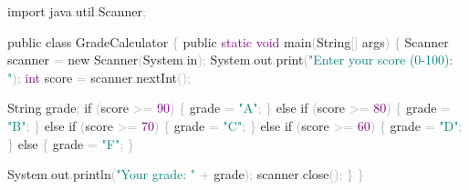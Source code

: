 \documentclass[
  justified,
  openright,
]{tufte-book}
\newcommand{\BuiltInTok}[1]{#1}
\newcommand{\ControlFlowTok}[1]{\textcolor{BrandBlue}{#1}}
\newcommand{\DataTypeTok}[1]{\textcolor{Purple}{#1}}
\newcommand{\DecValTok}[1]{\textcolor{Purple}{#1}}
\newcommand{\FunctionTok}[1]{\textcolor{BrandBlue}{#1}}
\newcommand{\ImportTok}[1]{\textcolor{BrandAccent}{#1}}
\newcommand{\KeywordTok}[1]{\textcolor{BrandBlue}{#1}}
\newcommand{\NormalTok}[1]{#1}
\newcommand{\OperatorTok}[1]{\textcolor{DarkGray}{#1}}
\newcommand{\StringTok}[1]{\textcolor{Teal}{#1}}
\newenvironment{Shaded}{%
  \begin{snugshade}
}{%
  \end{snugshade}
}
\begin{document}
\begin{Shaded}
\begin{Highlighting}[]
\KeywordTok{import} \ImportTok{java}\OperatorTok{.}\ImportTok{util}\OperatorTok{.}\ImportTok{Scanner}\OperatorTok{;}

\KeywordTok{public} \KeywordTok{class}\NormalTok{ GradeCalculator }\OperatorTok{\{}
    \KeywordTok{public} \DataTypeTok{static} \DataTypeTok{void} \FunctionTok{main}\OperatorTok{(}\BuiltInTok{String}\OperatorTok{[]}\NormalTok{ args}\OperatorTok{)} \OperatorTok{\{}
        \BuiltInTok{Scanner}\NormalTok{ scanner }\OperatorTok{=} \KeywordTok{new} \BuiltInTok{Scanner}\OperatorTok{(}\BuiltInTok{System}\OperatorTok{.}\FunctionTok{in}\OperatorTok{);}
        \BuiltInTok{System}\OperatorTok{.}\FunctionTok{out}\OperatorTok{.}\FunctionTok{print}\OperatorTok{(}\StringTok{"Enter your score (0{-}100): "}\OperatorTok{);}
        \DataTypeTok{int}\NormalTok{ score }\OperatorTok{=}\NormalTok{ scanner}\OperatorTok{.}\FunctionTok{nextInt}\OperatorTok{();}

        \BuiltInTok{String}\NormalTok{ grade}\OperatorTok{;}
        \ControlFlowTok{if} \OperatorTok{(}\NormalTok{score }\OperatorTok{\textgreater{}=} \DecValTok{90}\OperatorTok{)} \OperatorTok{\{}
\NormalTok{            grade }\OperatorTok{=} \StringTok{"A"}\OperatorTok{;}
        \OperatorTok{\}} \ControlFlowTok{else} \ControlFlowTok{if} \OperatorTok{(}\NormalTok{score }\OperatorTok{\textgreater{}=} \DecValTok{80}\OperatorTok{)} \OperatorTok{\{}
\NormalTok{            grade }\OperatorTok{=} \StringTok{"B"}\OperatorTok{;}
        \OperatorTok{\}} \ControlFlowTok{else} \ControlFlowTok{if} \OperatorTok{(}\NormalTok{score }\OperatorTok{\textgreater{}=} \DecValTok{70}\OperatorTok{)} \OperatorTok{\{}
\NormalTok{            grade }\OperatorTok{=} \StringTok{"C"}\OperatorTok{;}
        \OperatorTok{\}} \ControlFlowTok{else} \ControlFlowTok{if} \OperatorTok{(}\NormalTok{score }\OperatorTok{\textgreater{}=} \DecValTok{60}\OperatorTok{)} \OperatorTok{\{}
\NormalTok{            grade }\OperatorTok{=} \StringTok{"D"}\OperatorTok{;}
        \OperatorTok{\}} \ControlFlowTok{else} \OperatorTok{\{}
\NormalTok{            grade }\OperatorTok{=} \StringTok{"F"}\OperatorTok{;}
        \OperatorTok{\}}

        \BuiltInTok{System}\OperatorTok{.}\FunctionTok{out}\OperatorTok{.}\FunctionTok{println}\OperatorTok{(}\StringTok{"Your grade: "} \OperatorTok{+}\NormalTok{ grade}\OperatorTok{);}
\NormalTok{        scanner}\OperatorTok{.}\FunctionTok{close}\OperatorTok{();}
    \OperatorTok{\}}
\OperatorTok{\}}
\end{Highlighting}
\end{Shaded}
\end{document}
